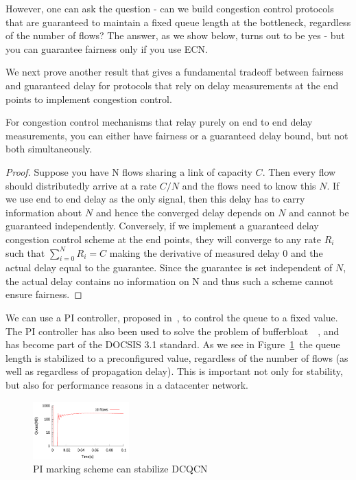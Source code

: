 However, one can ask the question - can we build congestion control protocols
that are guaranteed to maintain a fixed queue length at the bottleneck,
regardless of the number of flows? The answer, as we show below, turns out to be
yes - but you can guarantee fairness only if you use ECN.

We next prove another result that gives a fundamental tradeoff between fairness
and guaranteed delay for protocols that rely on delay measurements at the end
points to implement congestion control.

\begin{thm}
\label{thm:fairness-delay}
For congestion control mechanisms that relay purely on end to end
delay measurements, you can either have fairness or a guaranteed delay
bound, but not both simultaneously.
\end{thm}
\begin{proof}
Suppose you have N flows sharing a link of capacity $C$. Then every flow
should distributedly arrive at a rate $C/N$ and the flows need to know
this $N$. If we use end to end delay as the only signal, then this delay
has to carry information about $N$ and hence the converged delay
depends on $N$ and cannot be guaranteed independently. Conversely, if we implement a guaranteed delay congestion
control scheme at the end points, they
will converge to any rate $R_i$ such that $\sum_{i=0}^{N}R_i = C$
making the derivative of measured delay 0 and the actual delay equal
to the guarantee. Since the guarantee is set independent of $N$, the
actual delay contains no information on N and 
thus such a scheme cannot ensure fairness.
\end{proof}

We can use a PI controller, proposed in~\cite{Hollot:PIController}, to
control the queue to a fixed value.  The PI
controller has also been used to solve the problem of bufferbloat~\cite{conf/hpsr/PanNPPSBV13,bufferbloat-pi}~, and
has become part of the DOCSIS 3.1 standard. As we see in
Figure~\ref{fig:dcqcn_pi}~the queue length is stabilized to a
preconfigured value, regardless of the number of flows (as well as
regardless of propagation delay). This is important not only for
stability, but also for performance reasons in a datacenter network.


\begin{figure}
\center
\includegraphics[width=0.33\textwidth]{figures/stable_q_85_pi.pdf}
\caption{PI marking scheme can stabilize DCQCN}
\label{fig:dcqcn_pi}
\end{figure}

